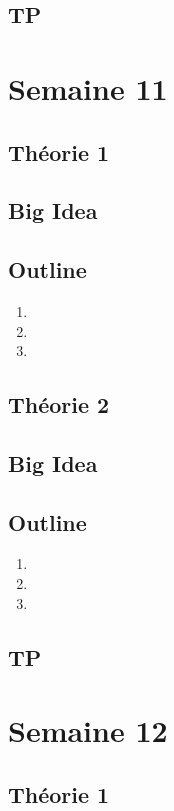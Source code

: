 \documentclass{article}
\begin{document}
\subsection{TP}

\pagebreak
\section{Semaine 11}
\subsection{Théorie 1}
\subsection*{Big Idea}
\subsection*{Outline}
    \begin{enumerate}
    \item
    \item
    \item
    \end{enumerate}
\subsection{Théorie 2}
\subsection*{Big Idea}
\subsection*{Outline}
    \begin{enumerate}
    \item
    \item
    \item
    \end{enumerate}
\subsection{TP}

\pagebreak
\section{Semaine 12}
\subsection{Théorie 1}
\end{document}
